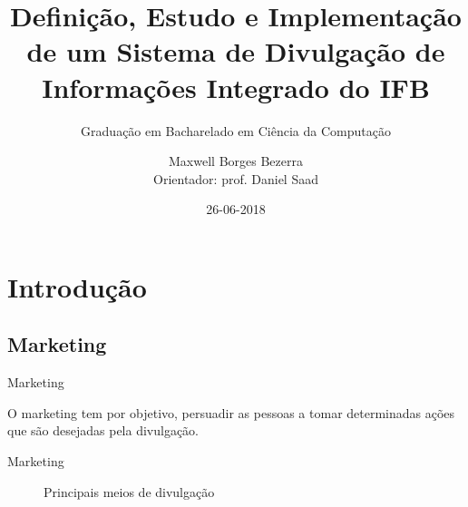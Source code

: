 \documentclass{aula-ifb}
\author{Maxwell Borges Bezerra\\ 
\small{Orientador: prof. Daniel Saad}}
\title{Definição, Estudo e Implementação de um Sistema de Divulgação de Informações Integrado do IFB}
\subtitle{Graduação em Bacharelado em Ciência da Computação}
\institute{Instituto Federal de Brasília, Câmpus Taguatinga}
\date{26-06-2018}
\begin{document}
\maketitle
\section{Introdução}
\subsection{Marketing}
\begin{frame}{Marketing}
\begin{center}
O marketing tem por objetivo, persuadir as pessoas a tomar determinadas ações que são desejadas pela divulgação.
\end{center}
\end{frame}

\begin{frame}{Marketing}
\begin{figure}[h]
  \centering
  \caption{Principais meios de divulgação}
  \quad %
  \quad %
  \quad %
\label{fig1}
\end{figure}
\end{frame}
\end{document}
